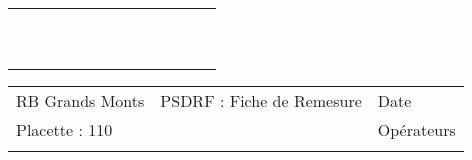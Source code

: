 \documentclass[a4paper, landscape]{article}\usepackage[]{graphicx}\usepackage[]{color}
\begin{document}
{\begin{tabular}{|p{1cm}|p{2cm}|p{1.6cm}|p{1.6cm}|p{1.6cm}|p{1.6cm}|p{1.5cm}|p{1.5cm}|p{1.5cm}|p{1.5cm}|p{1.5cm}|p{7.5cm}|p{5cm}|}
   \rowcolor[gray]{0.95} \hline
 &  &  &  &  &  &  &  &  &  &  &  &  \\ 
   \hline
 &  &  &  &  &  &  &  &  &  &  &  &  \\ 
   \rowcolor[gray]{0.95} \hline
 &  &  &  &  &  &  &  &  &  &  &  &  \\ 
   \hline
 &  &  &  &  &  &  &  &  &  &  &  &  \\ 
   \rowcolor[gray]{0.95} \hline
 &  &  &  &  &  &  &  &  &  &  &  &  \\ 
   \hline
 &  &  &  &  &  &  &  &  &  &  &  &  \\ 
   \rowcolor[gray]{0.95} \hline
 &  &  &  &  &  &  &  &  &  &  &  &  \\ 
   \hline
 &  &  &  &  &  &  &  &  &  &  &  &  \\ 
   \rowcolor[gray]{0.95} \hline
 &  &  &  &  &  &  &  &  &  &  &  &  \\ 
   \hline
 &  &  &  &  &  &  &  &  &  &  &  &  \\ 
   \rowcolor[gray]{0.95} \hline
 &  &  &  &  &  &  &  &  &  &  &  &  \\ 
   \hline
\end{tabular}
}

\begin{tabular}{p{10cm}p{10cm}p{8cm}}
  RB Grands Monts & PSDRF : Fiche de Remesure & Date \\ 
  Placette : 110 &  & Opérateurs \\ 
   &  &  \\ 
  \end{tabular}
\end{document}
